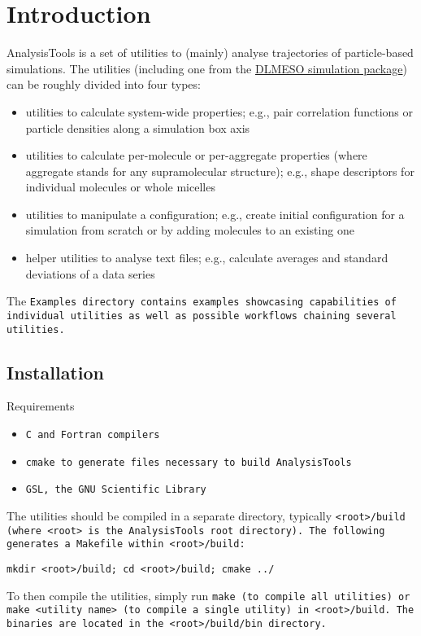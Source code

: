 \chapter{Introduction}

AnalysisTools is a set of utilities to (mainly) analyse trajectories of
particle-based simulations. The utilities (including one
from the \href{https://www.scd.stfc.ac.uk/Pages/DL_MESO.aspx}{DLMESO
simulation package}) can be roughly divided into four types:

\begin{itemize}
  \item utilities to calculate system-wide properties; e.g., pair
    correlation functions or particle densities along a simulation box axis
  \item utilities to calculate per-molecule or per-aggregate properties
    (where aggregate stands for any supramolecular structure); e.g., shape
    descriptors for individual molecules or whole micelles
  \item utilities to manipulate a configuration; e.g., create initial
    configuration for a simulation from scratch or by adding molecules to
    an existing one
  \item helper utilities to analyse text files; e.g., calculate averages
    and standard deviations of a data series
\end{itemize}

The \tt{Examples} directory contains examples showcasing capabilities of
individual utilities as well as possible workflows chaining several utilities.

\section{Installation}

Requirements
\begin{itemize}
  \item \tt{C} and \tt{Fortran} compilers
  \item \tt{cmake} to generate files necessary to build AnalysisTools
  \item \tt{GSL}, the GNU Scientific Library
\end{itemize}

The utilities should be compiled in a separate directory, typically
\tt{<root>/build} (where \tt{<root>} is the AnalysisTools root directory). The
following generates a \tt{Makefile} within \tt{<root>/build}:

\tt{mkdir <root>/build; cd <root>/build; cmake ../}

To then compile the utilities, simply run \tt{make} (to compile all utilities)
or \tt{make <utility name>} (to compile a single utility) in \tt{<root>/build}.
The binaries are located in the \tt{<root>/build/bin} directory.
